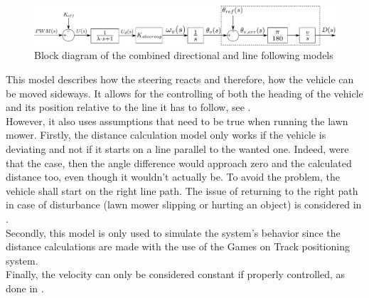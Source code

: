 \begin{figure}[H]
  \centering
  \includegraphics[width=1\textwidth]{figures/steeringModelWithLineFollowing.pdf}
  \caption{Block diagram of the combined directional and line following models}
  \label{fig:steeringLineFollowingModel}
\end{figure}

This model describes how the steering reacts and therefore, how the vehicle can be moved sideways. It allows for the controlling of both the heading of the vehicle and its position relative to the line it has to follow, see .\\
However, it also uses assumptions that need to be true when running the lawn mower. Firstly, the distance calculation model only works if the vehicle is deviating and not if it starts on a line parallel to the wanted one. Indeed, were that the case, then the angle difference would approach zero and the calculated distance too, even though it wouldn't actually be. To avoid the problem, the vehicle shall start on the right line path. The issue of returning to the right path in case of disturbance (lawn mower slipping or hurting an object) is considered in .\\
Secondly, this model is only used to simulate the system's behavior since the distance calculations are made with the use of the Games on Track positioning system.\\
Finally, the velocity can only be considered constant if properly controlled, as done in .